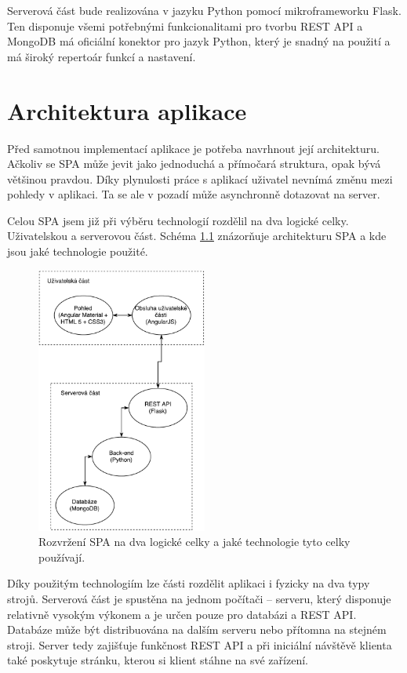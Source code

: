 Serverová část bude realizována v jazyku Python pomocí mikroframeworku Flask. Ten disponuje všemi potřebnými funkcionalitami pro tvorbu REST API a MongoDB má oficiální konektor pro jazyk Python, který je snadný na použití a má široký repertoár funkcí a nastavení.

\chapter{Architektura aplikace}
\label{architektura}

Před samotnou implementací aplikace je potřeba navrhnout její architekturu. Ačkoliv se SPA může jevit jako jednoduchá a přímočará struktura, opak bývá většinou pravdou. Díky plynulosti práce s aplikací uživatel nevnímá změnu mezi pohledy v aplikaci. Ta se ale v pozadí může asynchronně dotazovat na server.

Celou SPA jsem již při výběru technologií rozdělil na dva logické celky. Uživatelskou a serverovou část. Schéma \ref{fig:system} znázorňuje architekturu SPA a kde jsou jaké technologie použité.

\begin{figure}[ht]
    \centering
    \includegraphics[width=0.5\textwidth]{fig/SPA.pdf}
    \caption{Rozvržení SPA na dva logické celky a jaké technologie tyto celky používají.} \label{fig:system}
\end{figure}

Díky použitým technologiím lze části rozdělit aplikaci i fyzicky na dva typy strojů. Serverová část je spustěna na jednom počítači -- serveru, který disponuje relativně vysokým výkonem a je určen pouze pro databázi a REST API. Databáze může být distribuována na dalším serveru nebo přítomna na stejném stroji. Server tedy zajišťuje funkčnost REST API a při iniciální návštěvě klienta také poskytuje stránku, kterou si klient stáhne na své zařízení.

